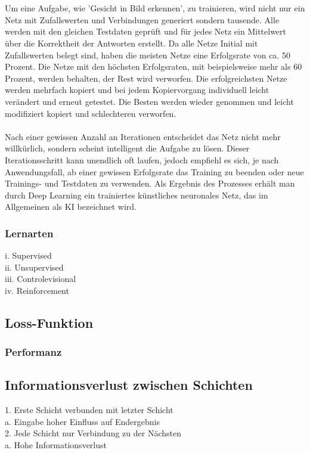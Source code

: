 \documentclass[12pt,oneside,a4paper,parskip]{scrbook}
\begin{document}
\\\\
Um eine Aufgabe, wie 'Gesicht in Bild erkennen', zu trainieren, wird nicht nur ein Netz mit Zufallswerten und Verbindungen generiert sondern tausende. Alle werden mit den gleichen Testdaten geprüft und für jedes Netz ein Mittelwert über die Korrektheit der Antworten erstellt. Da alle Netze Initial mit Zufallswerten belegt sind, haben die meisten Netze eine Erfolgsrate von ca. 50 Prozent. Die Netze mit den höchsten Erfolgsraten, mit beispielsweise mehr als 60 Prozent, werden behalten, der Rest wird verworfen. Die erfolgreichsten Netze werden mehrfach kopiert und bei jedem Kopiervorgang individuell leicht verändert und erneut getestet. Die Besten werden wieder genommen und leicht modifiziert kopiert und schlechteren verworfen.
\\\\
Nach einer gewissen Anzahl an Iterationen entscheidet das Netz nicht mehr willkürlich, sondern scheint intelligent die Aufgabe zu lösen. Dieser Iterationsschritt kann unendlich oft laufen, jedoch empfiehl es sich, je nach Anwendungsfall, ab einer gewissen Erfolgsrate das Training zu beenden oder neue Trainings- und Testdaten zu verwenden. Als Ergebnis des Prozesses erhält man durch Deep Learning ein trainiertes künstliches neuronales Netz, das im Allgemeinen als KI bezeichnet wird.
\subsubsection{Lernarten}
i.	Supervised
\\ii.	Unsupervised
\\iii.	Controlevisional
\\iv.	Reinforcement

\subsection{Loss-Funktion}
\subsubsection{Performanz}
\subsection{Informationsverlust zwischen Schichten}
1.	Erste Schicht verbunden mit letzter Schicht\\
	a.	Eingabe hoher Einfluss auf Endergebnis\\
2.	Jede Schicht nur Verbindung zu der Nächsten\\
	a.	Hohe Informationsverlust\\
\end{document}
